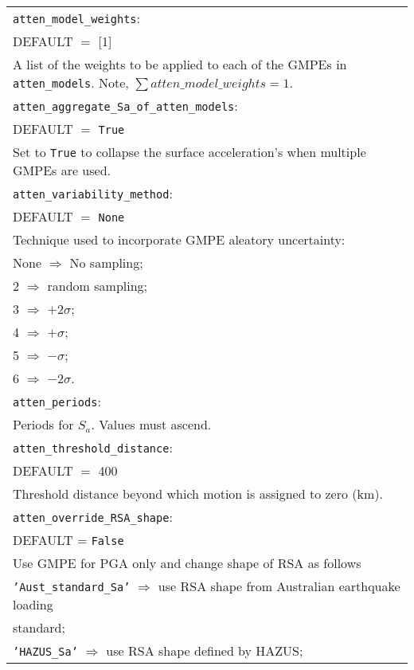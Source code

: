 \documentclass[a4paper, 12pt]{report}
\begin{document}
\begin{tabular}{|p{\textwidth}|}
\hline \vspace{0.1em} \texttt{atten\_model\_weights}: \\
DEFAULT $=$ [1] \\
A list of the weights to be applied to each of the GMPEs in
\texttt{atten\_models}.  Note, $\sum  atten\_model\_weights=1$. \\
\hline \vspace{0.1em}
\texttt{atten\_aggregate\_Sa\_of\_atten\_models}: \\
DEFAULT $=$ \texttt{True} \\
Set to \texttt{True} to collapse the surface acceleration's when
multiple GMPEs are used.\\
\hline \vspace{0.1em} \texttt{atten\_variability\_method}: \\
DEFAULT $=$ \texttt{None} \\
 Technique used to
incorporate GMPE aleatory uncertainty: \\
 \hspace{0.5em} None $\Rightarrow$ No sampling; \\
 \hspace{0.5em} 2 $\Rightarrow$ random sampling; \\
 \hspace{0.5em} 3 $\Rightarrow$ $+2\sigma$; \\
 \hspace{0.5em} 4 $\Rightarrow$ $+\sigma$; \\
 \hspace{0.5em} 5 $\Rightarrow$ $-\sigma$; \\
 \hspace{0.5em} 6 $\Rightarrow$ $-2\sigma$.\\
\hline \vspace{0.1em} \texttt{atten\_periods}: \\
Periods for $S_a$. Values must ascend. \\
\hline \vspace{0.1em} \texttt{atten\_threshold\_distance}: \\
DEFAULT $=$ 400 \\
Threshold distance beyond which motion is assigned to zero (km). \\
\hline \vspace{0.1em} \texttt{atten\_override\_RSA\_shape}: \\
DEFAULT = \texttt{False} \\
Use GMPE for PGA only and change shape of RSA as follows\\
 \hspace{0.5em} \texttt{'Aust\_standard\_Sa'} $\Rightarrow$
use RSA shape from Australian earthquake loading \\
\hspace{11em} standard; \\
 \hspace{0.5em} \texttt{'HAZUS\_Sa'}  $\Rightarrow$ use RSA shape defined by HAZUS;\\
\hline
\end{tabular}
\end{document}
